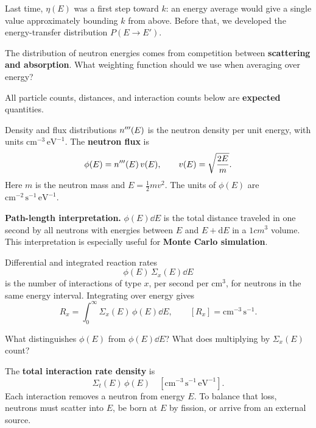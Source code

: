 \begin{handoutcolumns}
Last time, $\eta(E)$ was a first step toward $k$: an energy average
would give a single value approximately bounding $k$ from above.
Before that, we developed the energy-transfer distribution $P(E\!\to\!E')$.

\begin{checkpoint}
The distribution of neutron energies comes from competition between
\textbf{scattering and absorption}. What weighting function should we
use when averaging over energy?
\end{checkpoint}

All particle counts, distances, and interaction counts below are
\textbf{expected} quantities.

\begin{fixedbox}{Density and flux distributions}
$n^{\prime\prime\prime}(E)$ is the neutron density per unit energy, with units
$\mathrm{cm}^{-3}\,\mathrm{eV}^{-1}$. The \textbf{neutron flux} is
$$
\phi(E)=n^{\prime\prime\prime}(E)\,v(E),\qquad
v(E)=\sqrt{\frac{2E}{m}}.
$$
Here $m$ is the neutron mass and $E=\tfrac12 mv^2$.
The units of $\phi(E)$ are
$\mathrm{cm}^{-2}\,\mathrm{s}^{-1}\,\mathrm{eV}^{-1}$.
\end{fixedbox}

\textbf{Path-length interpretation.}
$\phi(E)\dd E$ is the total distance traveled in one second by all
neutrons with energies between $E$ and $E+\mathrm{d}E$ in a
$1\unit{cm^3}$ volume. This interpretation is especially useful for
\textbf{Monte Carlo simulation}.

\begin{fixedbox}{Differential and integrated reaction rates}
$$
\phi(E)\,\Sigma_x(E)\dd E
$$
is the number of interactions of type $x$, per second per
$\mathrm{cm}^3$, for neutrons in the same energy interval.
Integrating over energy gives
$$
R_x=\int_0^\infty\Sigma_x(E)\,\phi(E)\dd E,
\qquad [R_x]=\mathrm{cm}^{-3}\,\mathrm{s}^{-1}.
$$
\end{fixedbox}

\begin{checkpoint}
What distinguishes $\phi(E)$ from $\phi(E)\dd E$? What does multiplying
by $\Sigma_x(E)$ count?
\end{checkpoint}

\switchcolumn
\RaggedRight
{}
The \textbf{total interaction rate density} is
$$
\Sigma_t(E)\,\phi(E)
\quad [\mathrm{cm}^{-3}\,\mathrm{s}^{-1}\,\mathrm{eV}^{-1}].
$$
Each interaction removes a neutron from energy $E$. To balance that
loss, neutrons must scatter into $E$, be born at $E$ by fission, or
arrive from an external source.


\end{handoutcolumns}
